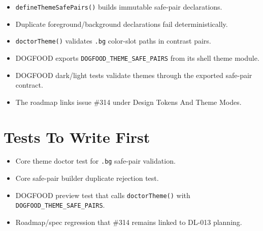 \begin{itemize}
\tightlist
\item
  \texttt{d\allowbreak{}e\allowbreak{}f\allowbreak{}i\allowbreak{}n\allowbreak{}e\allowbreak{}T\allowbreak{}h\allowbreak{}e\allowbreak{}m\allowbreak{}e\allowbreak{}S\allowbreak{}a\allowbreak{}f\allowbreak{}e\allowbreak{}P\allowbreak{}a\allowbreak{}i\allowbreak{}r\allowbreak{}s\allowbreak{}(\allowbreak{})} builds immutable safe-pair declarations.
\item
  Duplicate foreground/background declarations fail deterministically.
\item
  \texttt{d\allowbreak{}o\allowbreak{}c\allowbreak{}t\allowbreak{}o\allowbreak{}r\allowbreak{}T\allowbreak{}h\allowbreak{}e\allowbreak{}m\allowbreak{}e\allowbreak{}(\allowbreak{})} validates \texttt{.\allowbreak{}b\allowbreak{}g} color-slot paths in contrast pairs.
\item
  DOGFOOD exports \texttt{D\allowbreak{}O\allowbreak{}G\allowbreak{}F\allowbreak{}O\allowbreak{}O\allowbreak{}D\allowbreak{}\_\allowbreak{}T\allowbreak{}H\allowbreak{}E\allowbreak{}M\allowbreak{}E\allowbreak{}\_\allowbreak{}S\allowbreak{}A\allowbreak{}F\allowbreak{}E\allowbreak{}\_\allowbreak{}P\allowbreak{}A\allowbreak{}I\allowbreak{}R\allowbreak{}S} from its shell theme module.
\item
  DOGFOOD dark/light tests validate themes through the exported safe-pair contract.
\item
  The roadmap links issue \#314 under Design Tokens And Theme Modes.
\end{itemize}

\section{Tests To Write First}\label{record-180-tests-to-write-first}

\begin{itemize}
\tightlist
\item
  Core theme doctor test for \texttt{.\allowbreak{}b\allowbreak{}g} safe-pair validation.
\item
  Core safe-pair builder duplicate rejection test.
\item
  DOGFOOD preview test that calls \texttt{d\allowbreak{}o\allowbreak{}c\allowbreak{}t\allowbreak{}o\allowbreak{}r\allowbreak{}T\allowbreak{}h\allowbreak{}e\allowbreak{}m\allowbreak{}e\allowbreak{}(\allowbreak{})} with \texttt{D\allowbreak{}O\allowbreak{}G\allowbreak{}F\allowbreak{}O\allowbreak{}O\allowbreak{}D\allowbreak{}\_\allowbreak{}T\allowbreak{}H\allowbreak{}E\allowbreak{}M\allowbreak{}E\allowbreak{}\_\allowbreak{}S\allowbreak{}A\allowbreak{}F\allowbreak{}E\allowbreak{}\_\allowbreak{}P\allowbreak{}A\allowbreak{}I\allowbreak{}R\allowbreak{}S}.
\item
  Roadmap/spec regression that \#314 remains linked to DL-013 planning.
\end{itemize}

